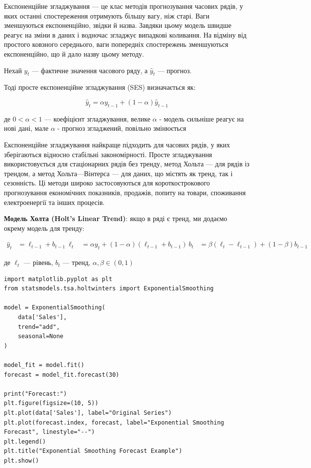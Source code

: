 Експоненційне згладжування — це клас методів прогнозування часових рядів, у яких останні спостереження отримують більшу вагу, ніж старі.
Ваги зменшуються експоненційно, звідки й назва. Завдяки цьому модель швидше реагує на зміни в даних і водночас згладжує випадкові коливання. На відміну від простого ковзного середнього, ваги попередніх спостережень зменшуються експоненційно, що й дало назву цьому методу.

Нехай $ y_t $ — фактичне значення часового ряду, а $ \hat{y}_{t} $ — прогноз.

Тоді просте експоненційне згладжування (SES) визначається як:

$$
\hat{y}_{t} = \alpha y_{t-1} + (1 - \alpha)\hat{y}_{t-1}
$$

де $ 0 < \alpha < 1 $ — коефіцієнт згладжування, велике $ \alpha $ - модель сильніше реагує на нові дані, мале $ \alpha $ - прогноз згладжений, повільно змінюється

Експоненційне згладжування найкраще підходить для часових рядів, у яких зберігаються відносно стабільні закономірності. Просте згладжування використовується для стаціонарних рядів без тренду, метод Хольта — для рядів із трендом, а метод Хольта—Вінтерса — для даних, що містять як тренд, так і сезонність. Ці методи широко застосовуються для короткострокового прогнозування економічних показників, продажів, попиту на товари, споживання електроенергії та інших процесів.


\textbf{Модель Холта (Holt’s Linear Trend)}: якщо в ряді є тренд, ми додаємо окрему модель для тренду:

$$
\begin{aligned}
\hat{y}_{t} &= \ell_{t-1} + b_{t-1} \
\ell_t &= \alpha y_t + (1-\alpha)(\ell_{t-1} + b_{t-1}) \
b_t &= \beta (\ell_t - \ell_{t-1}) + (1-\beta) b_{t-1}
\end{aligned}
$$

де $ \ell_t $ — рівень, $ b_t $ — тренд, $ \alpha, \beta \in (0,1) $

\begin{lstlisting}
import matplotlib.pyplot as plt
from statsmodels.tsa.holtwinters import ExponentialSmoothing

model = ExponentialSmoothing(
    data['Sales'],
    trend="add",      
    seasonal=None     
)

model_fit = model.fit()
forecast = model_fit.forecast(30)

print("Forecast:")
plt.figure(figsize=(10, 5))
plt.plot(data['Sales'], label="Original Series")
plt.plot(forecast.index, forecast, label="Exponential Smoothing Forecast", linestyle="--")
plt.legend()
plt.title("Exponential Smoothing Forecast Example")
plt.show()
\end{lstlisting}

